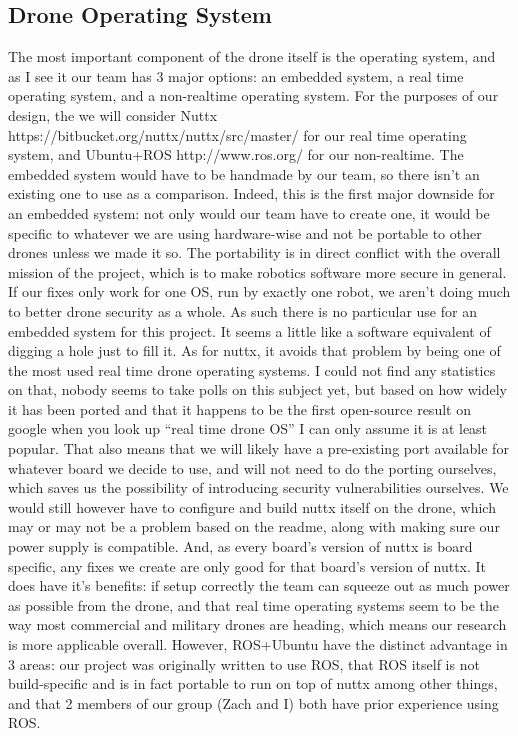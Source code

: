\documentclass[IEEEtran,letterpaper,10pt,titlepage,draftclsnofoot,onecolumn]{article}
\begin{document}
\subsection*{Drone Operating System}
The most important component of the drone itself is the operating system, and as I see it our team has 3 major options: an embedded system, a real time operating system, and a non-realtime operating system. 
For the purposes of our design, the we will consider Nuttx https://bitbucket.org/nuttx/nuttx/src/master/ for our real time operating system, and Ubuntu+ROS http://www.ros.org/ for our non-realtime. 
The embedded system would have to be handmade by our team, so there isn't an existing one to use as a comparison. 
Indeed, this is the first major downside for an embedded system: not only would our team have to create one, it would be specific to whatever we are using hardware-wise and not be portable to other drones unless we made it so. 
The portability is in direct conflict with the overall mission of the project, which is to make robotics software more secure in general. 
If our fixes only work for one OS, run by exactly one robot, we aren't doing much to better drone security as a whole. 
As such there is no particular use for an embedded system for this project. 
It seems a little like a software equivalent of digging a hole just to fill it. 
As for nuttx, it avoids that problem by being one of the most used real time drone operating systems. 
I could not find any statistics on that, nobody seems to take polls on this subject yet, but based on how widely it has been ported and that it happens to be the first open-source result on google when you look up “real time drone OS” I can only assume it is at least popular. 
That also means that we will likely have a pre-existing port available for whatever board we decide to use, and will not need to do the porting ourselves, which saves us the possibility of introducing security vulnerabilities ourselves. 
We would still however have to configure and build nuttx itself on the drone, which may or may not be a problem based on the readme, along with making sure our power supply is compatible. 
And, as every board's version of nuttx is board specific, any fixes we create are only good for that board's version of nuttx. 
It does have it's benefits: if setup correctly the team can squeeze out as much power as possible from the drone, and that real time operating systems seem to be the way most commercial and military drones are heading, which means our research is more applicable overall. 
However, ROS+Ubuntu have the distinct advantage in 3 areas: our project was originally written to use ROS, that ROS itself is not build-specific and is in fact portable to run on top of nuttx among other things, and that 2 members of our group (Zach and I) both have prior experience using ROS. 
\end{document}
